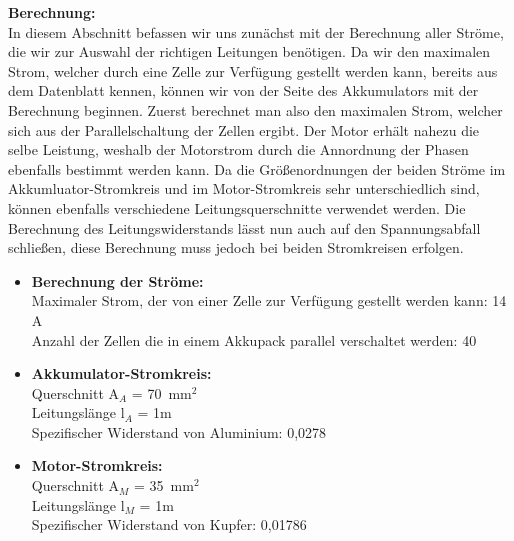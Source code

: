 \textbf{Berechnung:} 
\\[2mm]
In diesem Abschnitt befassen wir uns zunächst mit der Berechnung aller Ströme, die wir zur Auswahl der richtigen Leitungen benötigen. Da wir den maximalen Strom, welcher durch eine Zelle zur Verfügung gestellt werden kann, bereits aus dem Datenblatt kennen, können wir von der Seite des Akkumulators mit der Berechnung beginnen. Zuerst berechnet man also den maximalen Strom, welcher sich aus der Parallelschaltung der Zellen ergibt. Der Motor erhält nahezu die selbe Leistung, weshalb der Motorstrom durch die Annordnung der Phasen ebenfalls bestimmt werden kann. Da die Größenordnungen der beiden Ströme im Akkumluator-Stromkreis und im Motor-Stromkreis sehr unterschiedlich sind, können ebenfalls verschiedene Leitungsquerschnitte verwendet werden. Die Berechnung des Leitungswiderstands lässt nun auch auf den Spannungsabfall schließen, diese Berechnung muss jedoch bei beiden Stromkreisen erfolgen.\\[4mm]
\begin{itemize}
	\item \textbf{Berechnung der Ströme:}
	\\[1mm] Maximaler Strom, der von einer Zelle zur Verfügung gestellt werden kann: 14 A 
	\\ Anzahl der Zellen die in einem Akkupack parallel verschaltet werden: 40 \\[3mm]
	\item \textbf{Akkumulator-Stromkreis:} 
	\\[1mm] Querschnitt    A$_A$ =  70~mm$^2$
	\\ Leitungslänge  l$_A$ =  1m  		
	\\ Spezifischer Widerstand von Aluminium: 	0,0278 \\[3mm]
	\item \textbf{Motor-Stromkreis:}
	\\[1mm] Querschnitt    A$_M$ =  35~mm$^2$
	\\ Leitungslänge  l$_M$ =  1m  		
	\\ Spezifischer Widerstand von Kupfer:		0,01786
\end{itemize}

